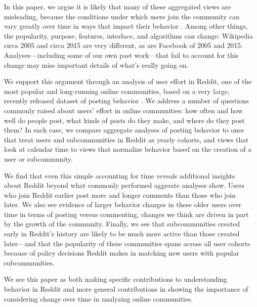 In this paper, we argue it is likely that many of these aggregated views are misleading, because the conditions under which users join the community can vary greatly over time in ways that impact their behavior \cite{Miller2015}.  Among other things, the popularity, purpose, features, interface, and algorithms can change: Wikipedia circa 2005 and circa 2015 are very different, as are Facebook of 2005 and 2015.  Analyses---including some of our own past work---that fail to account for this change may miss important details of what's really going on.

We support this argument through an analysis of user effort in Reddit, one of the most popular and long-running online communities, based on a very large, recently released dataset of posting behavior \cite{}.  We address a number of questions commonly raised about users' effort in online communities: how often and how well do people post, what kinds of posts do they make, and where do they post them?  In each case, we compare aggregate analyses of posting behavior to ones that treat users and subcommunities in Reddit as yearly cohorts, and views that look at calendar time to views that normalize behavior based on the creation of a user or subcommunity.

We find that even this simple accounting for time reveals additional insights about Reddit beyond what commonly performed aggreate analyses show.  Users who join Reddit earlier post more and longer comments than those who join later.  We also see evidence of larger behavior changes in these older users over time in terms of posting versus commenting, changes we think are driven in part by the growth of the community.  Finally, we see that subcommunities created early in Reddit's history are likely to be much more active than those created later---and that the popularity of these communities spans across all user cohorts because of policy decisions Reddit makes in matching new users with popular subcommunities. 

We see this paper as both making specific contributions to understanding behavior in Reddit and more general contributions in showing the importance of considering change over time in analyzing online communities.  

